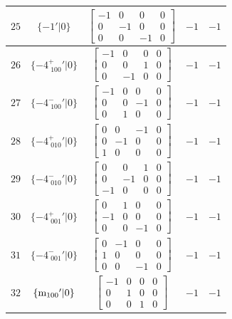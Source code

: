 \documentclass[fleqn,8pt]{jsarticle}
\begin{document}
\begin{longtable}{ccccc}
$ 25 $ & $ \{-1{}'|0\} $ & $ \begin{bmatrix} -1 & 0 & 0 & 0 \\ 0 & -1 & 0 & 0 \\ 0 & 0 & -1 & 0 \end{bmatrix} $ & $ -1 $ & $ -1 $ \\ \hline
$ 26 $ & $ \{-4^{+}_{\,\,100}{}'|0\} $ & $ \begin{bmatrix} -1 & 0 & 0 & 0 \\ 0 & 0 & 1 & 0 \\ 0 & -1 & 0 & 0 \end{bmatrix} $ & $ -1 $ & $ -1 $ \\ \hline
$ 27 $ & $ \{-4^{-}_{\,\,100}{}'|0\} $ & $ \begin{bmatrix} -1 & 0 & 0 & 0 \\ 0 & 0 & -1 & 0 \\ 0 & 1 & 0 & 0 \end{bmatrix} $ & $ -1 $ & $ -1 $ \\ \hline
$ 28 $ & $ \{-4^{+}_{\,\,010}{}'|0\} $ & $ \begin{bmatrix} 0 & 0 & -1 & 0 \\ 0 & -1 & 0 & 0 \\ 1 & 0 & 0 & 0 \end{bmatrix} $ & $ -1 $ & $ -1 $ \\ \hline
$ 29 $ & $ \{-4^{-}_{\,\,010}{}'|0\} $ & $ \begin{bmatrix} 0 & 0 & 1 & 0 \\ 0 & -1 & 0 & 0 \\ -1 & 0 & 0 & 0 \end{bmatrix} $ & $ -1 $ & $ -1 $ \\ \hline
$ 30 $ & $ \{-4^{+}_{\,\,001}{}'|0\} $ & $ \begin{bmatrix} 0 & 1 & 0 & 0 \\ -1 & 0 & 0 & 0 \\ 0 & 0 & -1 & 0 \end{bmatrix} $ & $ -1 $ & $ -1 $ \\ \hline
$ 31 $ & $ \{-4^{-}_{\,\,001}{}'|0\} $ & $ \begin{bmatrix} 0 & -1 & 0 & 0 \\ 1 & 0 & 0 & 0 \\ 0 & 0 & -1 & 0 \end{bmatrix} $ & $ -1 $ & $ -1 $ \\ \hline
$ 32 $ & $ \{{\rm m}_{100}{}'|0\} $ & $ \begin{bmatrix} -1 & 0 & 0 & 0 \\ 0 & 1 & 0 & 0 \\ 0 & 0 & 1 & 0 \end{bmatrix} $ & $ -1 $ & $ -1 $ \\ \hline

\end{longtable}
\end{document}
